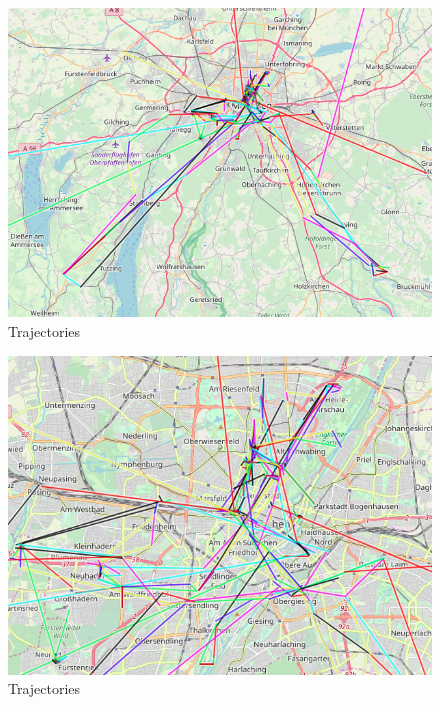 \begin{figure}[h!]
	\caption{Trajectories}
	\label{trajectories1}
	\includegraphics[width=\textwidth]{data/trajectories-2.png}
\end{figure}

\begin{figure}[h!]
	\caption{Trajectories}
	\label{trajectories2}
	\includegraphics[width=\textwidth]{data/trajectories-3.png}
\end{figure}

